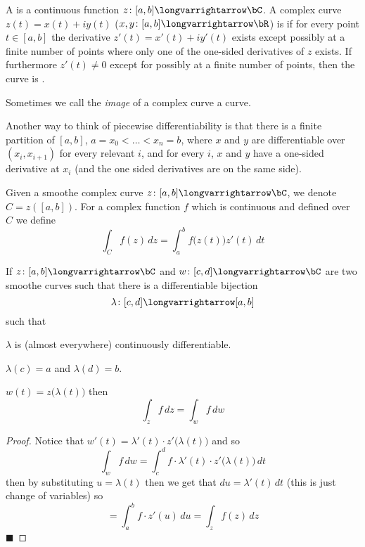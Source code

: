 \documentclass[10pt]{article}
\let\longto=\longvarrightarrow
\def\qed{\hskip1cm\hbox{}\hfill$\blacksquare$}
\begin{document}
\begin{defn*}

    A  is a continuous function $z\colon[a,b]\longto\bC$.
    A complex curve $z(t)=x(t)+iy(t)$ ($x,y\colon[a,b]\longto\bR$) is  if for every point $t\in[a,b]$ the derivative $z'(t)=x'(t)+iy'(t)$ exists except possibly at a finite
    number of points where only one of the one-sided derivatives of $z$ exists.
    If furthermore $z'(t)\neq0$ except for possibly at a finite number of points, then the curve is .

    Sometimes we call the \emph{image} of a complex curve a curve.

\end{defn*}

Another way to think of piecewise differentiability is that there is a finite partition of $[a,b]$, $a=x_0<\dots<x_n=b$, where $x$ and $y$ are differentiable over $(x_i,x_{i+1})$ for every relevant $i$, and
for every $i$, $x$ and $y$ have a one-sided derivative at $x_i$ (and the one sided derivatives are on the same side).

\begin{defn*}

    Given a smoothe complex curve $z\colon[a,b]\longto\bC$, we denote $C=z([a,b])$.
    For a complex function $f$ which is continuous and defined over $C$ we define
    \[ \int_C f(z)\,dz = \int_a^b f\bigl(z(t)\bigr)z'(t)\,dt \]

\end{defn*}

\begin{prop*}

    If $z\colon[a,b]\longto\bC$ and $w\colon[c,d]\longto\bC$ are two smoothe curves such that there is a differentiable bijection
    \[ \lambda\colon[c,d]\longto[a,b] \]
    such that
    \benum
        \item $\lambda$ is (almost everywhere) continuously differentiable.
        \item $\lambda(c)=a$ and $\lambda(d)=b$.
        \item $w(t)=z\bigl(\lambda(t)\bigr)$
    \eenum
    then
    \[ \int_z f\,dz = \int_w f\,dw \]

\end{prop*}

\begin{proof}

    Notice that $w'(t)=\lambda'(t)\cdot z'\bigl(\lambda(t)\bigr)$ and so
    \[ \int_w f\,dw = \int_c^d f\cdot\lambda'(t)\cdot z'\bigl(\lambda(t)\bigr)\,dt \]
    then by substituting $u=\lambda(t)$ then we get that $du=\lambda'(t)\,dt$ (this is just change of variables) so
    \[ = \int_a^b f\cdot z'(u)\,du = \int_z f(z)\,dz \]
    \qed

\end{proof}
\end{document}
